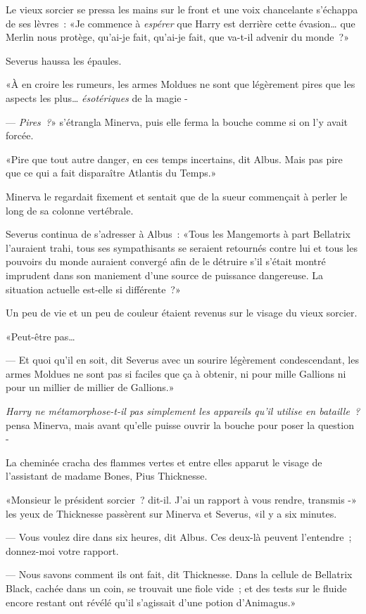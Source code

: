 Le vieux sorcier se pressa les mains sur le front et une voix chancelante s'échappa de ses lèvres~: «Je commence à \emph{espérer} que Harry est derrière cette évasion… que Merlin nous protège, qu'ai-je fait, qu'ai-je fait, que va-t-il advenir du monde~?»

Severus haussa les épaules.

«À en croire les rumeurs, les armes Moldues ne sont que légèrement pires que les aspects les plus… \emph{ésotériques} de la magie -

--- \emph{Pires~?}» s'étrangla Minerva, puis elle ferma la bouche comme si on l'y avait forcée.

«Pire que tout autre danger, en ces temps incertains, dit Albus. Mais pas pire que ce qui a fait disparaître Atlantis du Temps.»

Minerva le regardait fixement et sentait que de la sueur commençait à perler le long de sa colonne vertébrale.

Severus continua de s'adresser à Albus~: «Tous les Mangemorts à part Bellatrix l'auraient trahi, tous ses sympathisants se seraient retournés contre lui et tous les pouvoirs du monde auraient convergé afin de le détruire s'il s'était montré imprudent dans son maniement d'une source de puissance dangereuse. La situation actuelle est-elle si différente~?»

Un peu de vie et un peu de couleur étaient revenus sur le visage du vieux sorcier.

«Peut-être pas…

--- Et quoi qu'il en soit, dit Severus avec un sourire légèrement condescendant, les armes Moldues ne sont pas si faciles que ça à obtenir, ni pour mille Gallions ni pour un millier de millier de Gallions.»

\emph{Harry ne métamorphose-t-il pas simplement les appareils qu'il utilise en bataille~?} pensa Minerva, mais avant qu'elle puisse ouvrir la bouche pour poser la question -

La cheminée cracha des flammes vertes et entre elles apparut le visage de l'assistant de madame Bones, Pius Thicknesse.

«Monsieur le président sorcier~? dit-il. J'ai un rapport à vous rendre, transmis -» les yeux de Thicknesse passèrent sur Minerva et Severus, «il y a six minutes.

--- Vous voulez dire dans six heures, dit Albus. Ces deux-là peuvent l'entendre~; donnez-moi votre rapport.

--- Nous savons comment ils ont fait, dit Thicknesse. Dans la cellule de Bellatrix Black, cachée dans un coin, se trouvait une fiole vide~; et des tests sur le fluide encore restant ont révélé qu'il s'agissait d'une potion d'Animagus.»

